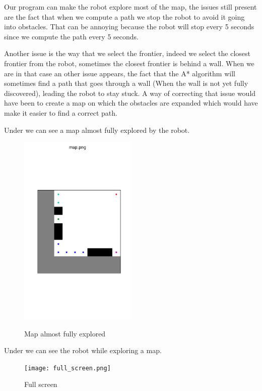 Our program can make the robot explore most of the map, the issues still present are the fact that when we compute a path we stop the robot to avoid it going into obstacles.
That can be annoying because the robot will stop every 5 seconds since we compute the path every 5 seconds.

Another issue is the way that we select the frontier, indeed we select the closest frontier from the robot, sometimes the closest frontier is behind a wall.
When we are in that case an other issue appears, the fact that the A* algorithm will sometimes find a path that goes through a wall (When the wall is not yet fully discovered), leading the robot to stay stuck.
A way of correcting that issue would have been to create a map on which the obstacles are expanded which would have make it easier to find a correct path.

Under we can see a map almost fully explored by the robot.

\FloatBarrier
\begin{figure}
    \centering\includegraphics[width=0.5\textwidth]{map.png}
    \label{fig:map}
    \caption{Map almost fully explored}
\end{figure}
\FloatBarrier

Under we can see the robot while exploring a map.

\FloatBarrier
\begin{figure}
    \centering\texttt{[image: full\_screen.png]}
    \label{fig:full_screen}
    \caption{Full screen}
\end{figure}
\FloatBarrier

